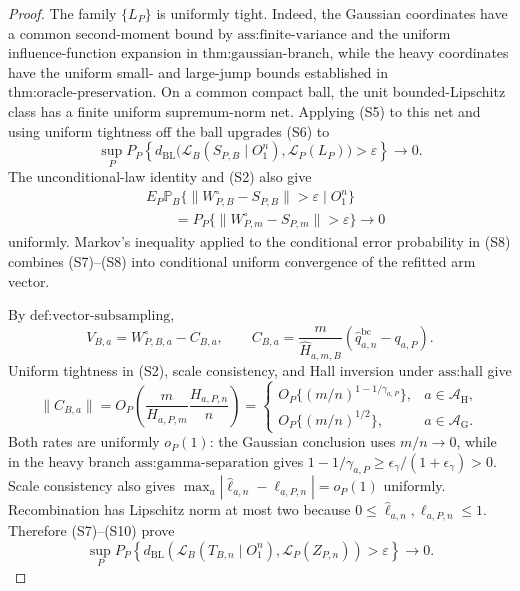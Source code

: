 \documentclass{article}
\begin{document}
\begin{proof}
The family \(\{L_P\}\) is uniformly tight. Indeed, the Gaussian coordinates have a common second-moment bound by \(\text{ass:finite-variance}\) and the uniform influence-function expansion in \(\text{thm:gaussian-branch}\), while the heavy coordinates have the uniform small- and large-jump bounds established in \(\text{thm:oracle-preservation}\). On a common compact ball, the unit bounded-Lipschitz class has a finite uniform supremum-norm net. Applying (S5) to this net and using uniform tightness off the ball upgrades (S6) to
\[
\sup_PP_P\!\left\{
d_{\mathrm{BL}}\bigl(\mathcal L_B(S_{P,B}\mid O_1^n),
\mathcal L_P(L_P)\bigr)>\varepsilon\right\}\longrightarrow0.
\tag{S7}
\]
The unconditional-law identity and (S2) also give
\[
\begin{split}
&E_P\mathbb P_B\{\|W_{P,B}^{\circ}-S_{P,B}\|>\varepsilon\mid O_1^n\}\\
&\qquad=P_P\{\|W_{P,m}^{\circ}-S_{P,m}\|>\varepsilon\}\longrightarrow0
\end{split}
\tag{S8}
\]
uniformly. Markov's inequality applied to the conditional error probability in (S8) combines (S7)--(S8) into conditional uniform convergence of the refitted arm vector.

By \(\text{def:vector-subsampling}\),
\[
V_{B,a}=W_{P,B,a}^{\circ}-C_{B,a},
\qquad
C_{B,a}=\frac m{\widehat H_{a,m,B}}
(\widehat q_{a,n}^{\mathrm{bc}}-q_{a,P}).
\tag{S9}
\]
Uniform tightness in (S2), scale consistency, and Hall inversion under \(\text{ass:hall}\) give
\[
\|C_{B,a}\|=O_P\!\left(\frac m{H_{a,P,m}}\frac{H_{a,P,n}}n\right)
=\begin{cases}
O_P\{(m/n)^{1-1/\gamma_{a,P}}\},&a\in\mathcal A_{\mathrm H},\\
O_P\{(m/n)^{1/2}\},&a\in\mathcal A_{\mathrm G}.
\end{cases}
\tag{S10}
\]
Both rates are uniformly \(o_P(1)\): the Gaussian conclusion uses \(m/n\to0\), while in the heavy branch \(\text{ass:gamma-separation}\) gives
\(1-1/\gamma_{a,P}\ge\epsilon_\gamma/(1+\epsilon_\gamma)>0\). Scale consistency also gives
\(\max_a|\widehat\ell_{a,n}-\ell_{a,P,n}|=o_P(1)\) uniformly. Recombination has Lipschitz norm at most two because \(0\le\widehat\ell_{a,n},\ell_{a,P,n}\le1\). Therefore (S7)--(S10) prove
\[
\sup_PP_P\!\left\{
d_{\mathrm{BL}}\!\left(
\mathcal L_B(T_{B,n}\mid O_1^n),
\mathcal L_P(Z_{P,n})\right)>\varepsilon\right\}\longrightarrow0.
\tag{S11}
\]


\end{proof}
\end{document}
